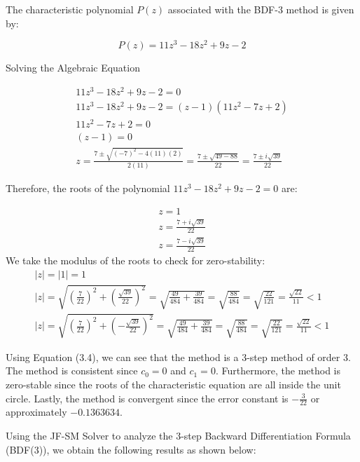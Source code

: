 \documentclass[a4paper, twoside]{report} %
\begin{document}
	The characteristic polynomial \(P(z)\) associated with the BDF-3 method is given by:

	\begin{equation}
		P(z) = 11z^3 - 18z^2 + 9z - 2
	\end{equation}



	Solving the Algebraic Equation

	\begin{eqnarray}
		11z^3 - 18z^2 + 9z - 2 = 0 \\
		11z^3 - 18z^2 + 9z - 2 = (z - 1)(11z^2 - 7z + 2) \\
		11z^2 - 7z + 2 = 0 \\
		(z - 1) = 0 \\
		z = \frac{7 \pm \sqrt{(-7)^2 - 4(11)(2)}}{2(11)} = \frac{7 \pm \sqrt{49 - 88}}{22} = \frac{7 \pm i\sqrt{39}}{22}
	\end{eqnarray}

	Therefore, the roots of the polynomial \(11z^3 - 18z^2 + 9z - 2 = 0\) are:

	\begin{eqnarray}
		z = 1 \\
		z = \frac{7 + i\sqrt{39}}{22} \\
		z = \frac{7 - i\sqrt{39}}{22}
	\end{eqnarray}
	We take the modulus of the roots to check for zero-stability:
	\begin{eqnarray}
		|z| = |1| = 1 \\
		|z| = \sqrt{\left(\frac{7}{22}\right)^2 + \left(\frac{\sqrt{39}}{22}\right)^2} = \sqrt{\frac{49}{484} + \frac{39}{484}} = \sqrt{\frac{88}{484}} = \sqrt{\frac{22}{121}} = \frac{\sqrt{22}}{11} < 1 \\
		|z| = \sqrt{\left(\frac{7}{22}\right)^2 + \left(-\frac{\sqrt{39}}{22}\right)^2} = \sqrt{\frac{49}{484} + \frac{39}{484}} = \sqrt{\frac{88}{484}} = \sqrt{\frac{22}{121}} = \frac{\sqrt{22}}{11} < 1
	\end{eqnarray}

	Using Equation (3.4), we can see that the method is a 3-step method of order 3. The method is consistent since \(c_0 = 0\) and \(c_1 = 0\). Furthermore, the method is zero-stable since the roots of the characteristic equation are all inside the unit circle. Lastly, the method is convergent since the error constant is \(-\frac{3}{22}\) or approximately \(-0.1363634\).

	Using the JF-SM Solver to analyze the 3-step Backward Differentiation Formula (BDF(3)), we obtain the following results as shown below:
\end{document}
